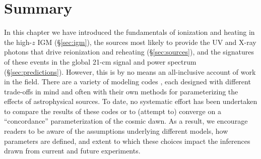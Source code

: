 %


\section{Summary}
In this chapter we have introduced the fundamentals of ionization and heating in the high-$z$ IGM (\S\ref{sec:igm}), the sources most likely to provide the UV and X-ray photons that drive reionization and reheating (\S\ref{sec:sources}), and the signatures of these events in the global 21-cm signal and power spectrum (\S\ref{sec:predictions}). However, this is by no means an all-inclusive account of work in the field. There are a variety of modeling codes \cite{Furlanetto2004,Barkana2005,Pritchard2007,Thomas2009,Mesinger2011,Fialkov2014a,Mirocha2014,Santos2010,Raste2018}, each designed with different trade-offs in mind and often with their own methods for parameterizing the effects of astrophysical sources. To date, no systematic effort has been undertaken to compare the results of these codes or to (attempt to) converge on a ``concordance'' parameterization of the cosmic dawn. As a result, we encourage readers to be aware of the assumptions underlying different models, how parameters are defined, and extent to which these choices impact the inferences drawn from current and future experiments.






